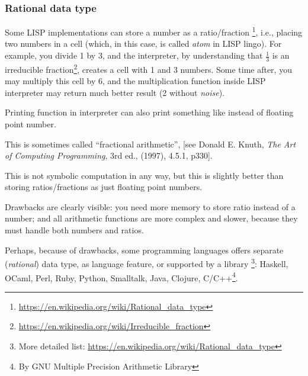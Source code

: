 \subsubsection{Rational data type}

Some LISP implementations can store a number as a ratio/fraction
\footnote{\url{https://en.wikipedia.org/wiki/Rational_data_type}}, i.e., placing two numbers in a cell (which, in this case, is called \textit{atom} in LISP lingo).
For example, you divide 1 by 3, and the interpreter, by understanding that $\frac{1}{3}$ is 
an irreducible fraction\footnote{\url{https://en.wikipedia.org/wiki/Irreducible_fraction}}, creates a cell with 1 and 3 numbers.
Some time after, you may multiply this cell by 6, and the multiplication function inside LISP interpreter may return much better result (2 without \textit{noise}).

Printing function in interpreter can also print something like  instead of floating point number.

This is sometimes called ``fractional arithmetic'',
[see Donald E. Knuth, \textit{The Art of Computing Programming}, 3rd ed., (1997), 4.5.1, p330].

This is not symbolic computation in any way, but this is slightly better than storing ratios/fractions as just floating point numbers.

Drawbacks are clearly visible: you need more memory to store ratio instead of a number;
and all arithmetic functions are more complex and slower, because they must handle both numbers and ratios.

Perhaps, because of drawbacks, some programming languages offers separate (\textit{rational}) data type, as language feature, or supported by a library
\footnote{More detailed list: \url{https://en.wikipedia.org/wiki/Rational_data_type}}:
Haskell, OCaml, Perl, Ruby, Python, Smalltalk, Java, Clojure, C/C++\footnote{By GNU Multiple Precision Arithmetic Library}.

